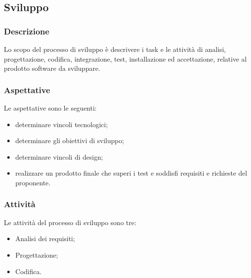 \subsection{Sviluppo}
\subsubsection{Descrizione}
Lo scopo del processo di sviluppo è descrivere i task e le attività di analisi, progettazione, codifica, integrazione, test, installazione ed accettazione, relative al prodotto software da sviluppare.
\subsubsection{Aspettative}
Le aspettative sono le seguenti:
\begin{itemize}
\item determinare vincoli tecnologici;
\item determinare gli obiettivi di sviluppo;
\item determinare vincoli di design;
\item realizzare un prodotto finale che superi i test e soddisfi requisiti e richieste del proponente.
\end{itemize}
\subsubsection{Attività}
Le attività del processo di sviluppo sono tre:
\begin{itemize}
\item Analisi dei requisiti;
\item Progettazione;
\item Codifica.
\end{itemize}
